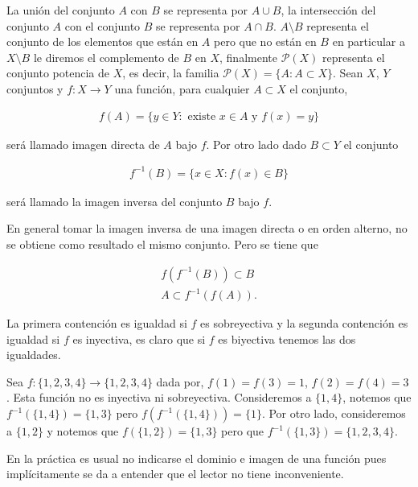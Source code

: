 La unión del conjunto $A$ con $B$ se representa por $A \cup B$, la intersección del conjunto $A$ con el conjunto $B$ se representa por $A \cap B$. $A \setminus B$ representa el conjunto de los elementos que están en $A$ pero que no están en $B$ en particular a $X\setminus B$ le diremos el complemento de $B$ en $X$,  finalmente $\mathcal{P}(X)$ representa el conjunto potencia de $X$, es decir, la familia $\mathcal{P}(X)=\{A: A \subset X\}$.  Sean $X$, $Y$ conjuntos y $f:X \to Y$ una función, para cualquier $A \subset X$ el conjunto,
 
 \begin{align*}
 f(A)=\{y \in Y : \text{ existe }x \in A \text{ y } f(x)=y\}
 \end{align*}

será llamado imagen directa de $A$ bajo $f$. Por otro lado  dado $B \subset Y$ el conjunto 

\begin{align*}
f^{-1}(B)=\{x \in X :  f(x) \in B \}
\end{align*}

será llamado la imagen inversa del conjunto $B$ bajo $f$. 

\begin{ob}
En general tomar la imagen inversa de una imagen directa o en orden alterno, no se obtiene como resultado el mismo conjunto. Pero se tiene que

	
	\begin{align*}
	f(f^{-1}(B)) \subset B \\
	A \subset f^{-1}(f(A)) .
	\end{align*}

La primera contención es igualdad si $f$ es sobreyectiva y la segunda contención es igualdad si $f$ es inyectiva, es claro que si $f$ es biyectiva tenemos las dos igualdades. 
\end{ob}

\begin{ej}
Sea $f:\{1,2,3,4\} \to \{1,2,3,4\}$ dada por, $f(1)=f(3)=1$, $f(2)=f(4)=3$. Esta función no es inyectiva ni sobreyectiva. Consideremos a $\{1,4\}$, notemos que $f^{-1}(\{1,4\})=\{1,3\}$ pero $f(f^{-1}(\{1,4\}))=\{1\}$. Por otro lado, consideremos a $\{1,2\}$ y notemos que $f(\{1,2\})=\{1,3\}$  pero que $f^{-1}(\{1,3\})=\{1,2,3,4\}$.
\end{ej}

En la práctica es usual no indicarse el dominio e imagen de una función pues implícitamente se da a entender que el lector no tiene inconveniente.

